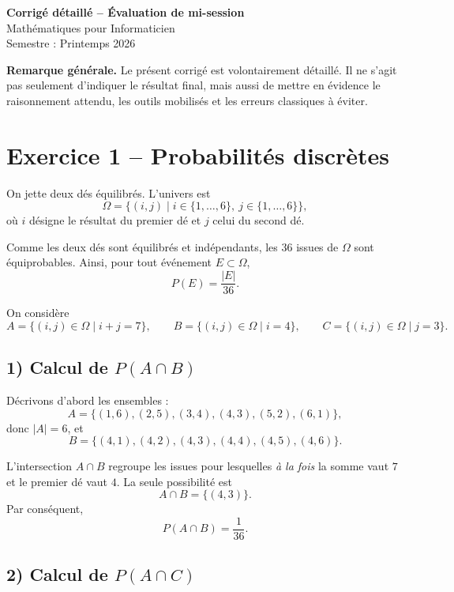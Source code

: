\documentclass[12pt,a4paper]{article}
\begin{document}
\begin{center}
    {\LARGE \textbf{Corrigé détaillé -- Évaluation de mi-session}}\\[0.2cm]
    {\large Mathématiques pour Informaticien}\\[0.1cm]
    Semestre : Printemps 2026
\end{center}

\vspace{0.4cm}

\noindent\textbf{Remarque générale.}
Le présent corrigé est volontairement détaillé. Il ne s'agit pas seulement d'indiquer le résultat final, mais aussi de mettre en évidence le raisonnement attendu, les outils mobilisés et les erreurs classiques à éviter.

\bigskip

\section*{Exercice 1 -- Probabilités discrètes}

On jette deux dés équilibrés. L'univers est
\[
\Omega=\{(i,j)\mid i\in\{1,\dots,6\},\ j\in\{1,\dots,6\}\},
\]
où $i$ désigne le résultat du premier dé et $j$ celui du second dé.

Comme les deux dés sont équilibrés et indépendants, les $36$ issues de $\Omega$ sont équiprobables. Ainsi, pour tout événement $E\subset \Omega$,
\[
P(E)=\frac{|E|}{36}.
\]

On considère
\[
A=\{(i,j)\in\Omega\mid i+j=7\},\qquad
B=\{(i,j)\in\Omega\mid i=4\},\qquad
C=\{(i,j)\in\Omega\mid j=3\}.
\]

\subsection*{1) Calcul de $P(A\cap B)$}

Décrivons d'abord les ensembles :
\[
A=\{(1,6),(2,5),(3,4),(4,3),(5,2),(6,1)\},
\]
donc $|A|=6$, et
\[
B=\{(4,1),(4,2),(4,3),(4,4),(4,5),(4,6)\}.
\]

L'intersection $A\cap B$ regroupe les issues pour lesquelles \emph{à la fois} la somme vaut $7$ et le premier dé vaut $4$. La seule possibilité est
\[
A\cap B=\{(4,3)\}.
\]
Par conséquent,
\[
P(A\cap B)=\frac{1}{36}.
\]

\subsection*{2) Calcul de $P(A\cap C)$}
\end{document}
